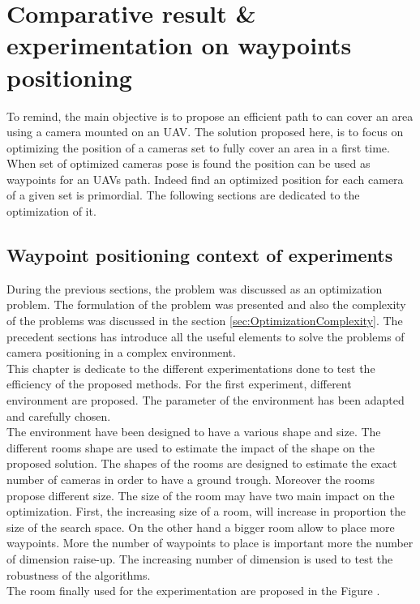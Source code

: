 \chapter{Comparative result \& experimentation on waypoints positioning } \label{chap:waypointPoseExp}
\minitoc
To remind, the main objective is to propose an efficient path to can cover an area using a camera mounted on an UAV. The solution proposed here, is to focus on optimizing the position of a cameras set to fully cover an area in a first time. When set of optimized cameras pose is found the position can be used as waypoints for an UAVs path. Indeed find an optimized position for each camera of a given set is primordial. The following sections are dedicated to the optimization of it. 







\section{ Waypoint  positioning context of experiments} \label{sec:contextOfExp}

 During the previous sections, the problem was discussed as an optimization problem. The formulation of the problem was presented and also the complexity of the problems was discussed in the section \ref{sec:OptimizationComplexity}. 
The precedent sections has introduce all the useful elements to solve the problems of camera positioning in a complex environment. \\
This chapter is dedicate to the different experimentations done to test the efficiency of the proposed methods. 
For the first experiment, different environment are proposed. The parameter of the environment has been adapted and carefully chosen. \\
The environment have been designed to have a various shape and size. The different rooms shape are used to estimate the impact of the shape on the proposed solution.
The shapes of the rooms are designed to estimate the exact number of cameras in order to have a ground trough.
Moreover the rooms propose different size. The size of the room may have two main impact on the optimization.
First, the increasing  size of a room, will increase in proportion the size of the search space. On the other hand a bigger room allow to place more waypoints. More the number of waypoints to place is important more the number of dimension raise-up. The increasing number of dimension is used to test the robustness of the algorithms.\\
 The room finally used for the experimentation are proposed in the Figure .

